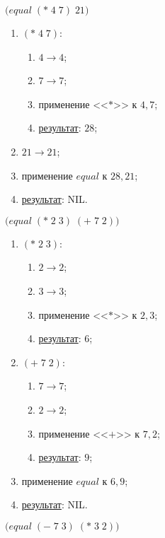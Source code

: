 \problem $\bigl(equal\; (*\; 4\; 7)\; 21\bigr)$

\begin{enumerate}
	\item $(*\; 4\; 7)$:
	\begin{enumerate}
		\item $4 \to 4$;
		\item $7 \to 7$;
		\item применение <<$*$>> к $4, 7$;
		\item \underline{результат}: $28$;
	\end{enumerate}
	\item $21 \to 21$;
	\item применение $equal$ к $28, 21$;
	\item \underline{результат}: NIL.
\end{enumerate}


\newpage
\problem $\bigl(equal\; (*\; 2\; 3)\; (+\; 7\; 2) \bigr)$

\begin{enumerate}
	\item $(*\; 2\; 3)$:
	\begin{enumerate}
		\item $2 \to 2$;
		\item $3 \to 3$;
		\item применение <<$*$>> к $2, 3$;
		\item \underline{результат}: $6$;
	\end{enumerate}
	\item $(+\; 7\; 2)$:
	\begin{enumerate}
		\item $7 \to 7$;
		\item $2 \to 2$;
		\item применение <<$+$>> к $7, 2$;
		\item \underline{результат}: $9$;
	\end{enumerate}
	\item применение $equal$ к $6, 9$;
	\item \underline{результат}: NIL.
\end{enumerate}


\problem $\bigl(equal\; (-\; 7\; 3)\; (*\; 3\; 2) \bigr)$

